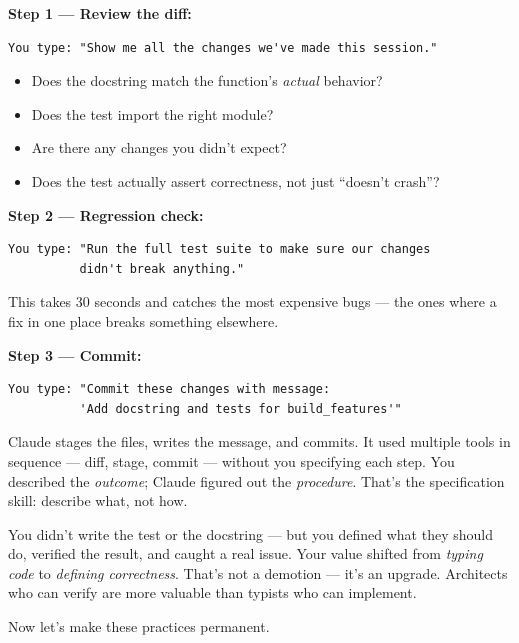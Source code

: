 \documentclass[10pt,oneside]{scrartcl}
\begin{document}
\textbf{Step 1 --- Review the diff:}

\begin{verbatim}
You type: "Show me all the changes we've made this session."
\end{verbatim}

\begin{tipbox}
\begin{itemize}[itemsep=1pt]
  \item Does the docstring match the function's \emph{actual} behavior?
  \item Does the test import the right module?
  \item Are there any changes you didn't expect?
  \item Does the test actually assert correctness, not just ``doesn't crash''?
\end{itemize}
\end{tipbox}

\textbf{Step 2 --- Regression check:}

\begin{verbatim}
You type: "Run the full test suite to make sure our changes
          didn't break anything."
\end{verbatim}


This takes 30 seconds and catches the most expensive bugs --- the ones where a fix in one place breaks something elsewhere.

\textbf{Step 3 --- Commit:}

\begin{verbatim}
You type: "Commit these changes with message:
          'Add docstring and tests for build_features'"
\end{verbatim}


Claude stages the files, writes the message, and commits. It used multiple tools in sequence --- diff, stage, commit --- without you specifying each step. You described the \emph{outcome}; Claude figured out the \emph{procedure}. That's the specification skill: describe what, not how.

\begin{whybox}
You didn't write the test or the docstring --- but you defined what they should do, verified the result, and caught a real issue. Your value shifted from \emph{typing code} to \emph{defining correctness}. That's not a demotion --- it's an upgrade. Architects who can verify are more valuable than typists who can implement.

Now let's make these practices permanent.
\end{whybox}
\end{document}
